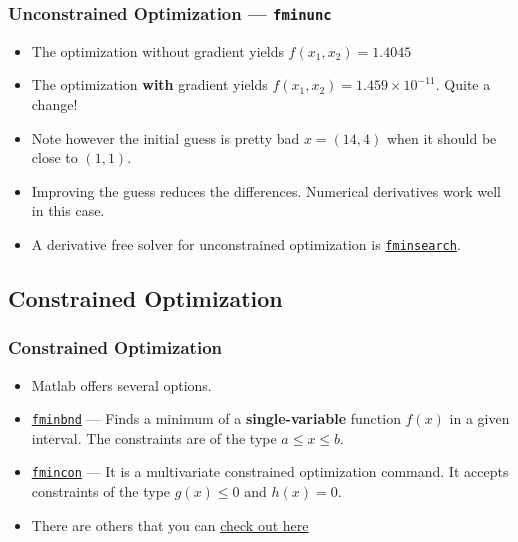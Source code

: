 \documentclass[11pt,xcolor={svgnames},aspectratio=169,usepdftitle=false,notheorems]{beamer}
\begin{document}
\begin{frame}[fragile]
  \frametitle{Unconstrained Optimization --- \texttt{fminunc}}
  \begin{itemize}
    \item The optimization without gradient yields $f(x_1,x_2) = 1.4045$
    \item The optimization \alert{\textbf{with}} gradient yields $f(x_1,x_2) = 1.459\times 10^{-11}$. Quite a change!
    \item Note however the initial guess is pretty bad $x = (14, 4)$ when it should be close to $(1,1)$.
    \item Improving the guess reduces the differences. Numerical derivatives work well in this case.
    \item A derivative free solver for unconstrained optimization is \href{https://www.mathworks.com/help/matlab/ref/fminsearch.html}{\texttt{fminsearch}}.
  \end{itemize}
\end{frame}

\subsection{Constrained Optimization}

\begin{frame}
  \frametitle{Constrained Optimization}
\begin{itemize}
  \item Matlab offers several options.
  \item \href{https://www.mathworks.com/help/matlab/ref/fminbnd.html?s_tid=doc_ta}{\texttt{fminbnd}} --- Finds a minimum of a \alert{\textbf{single-variable}} function $f(x)$ in a given interval. The constraints are of the type $a\leq x \leq b$.
  \item \href{https://www.mathworks.com/help/optim/ug/fmincon.html}{\texttt{fmincon}} --- It is a multivariate constrained optimization command. It accepts constraints of the type $g(x)\leq 0$ and $h(x) = 0$. 
  \item There are others that you can \href{https://www.mathworks.com/help/optim/ug/problems-handled-by-optimization-toolbox-functions.html\#tblminprobs}{check out here}
\end{itemize}
\end{frame}
\end{document}
